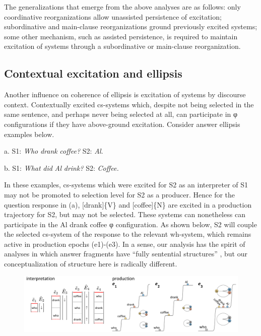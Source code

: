   The generalizations that emerge from the above analyses are as follows: only coordinative reorganizations allow unassisted persistence of excitation; subordinative and main-clause reorganizations ground previously excited systems; some other mechanism, such as assisted persistence, is required to maintain excitation of systems through a subordinative or main-clause reorganization. 

\subsection{Contextual excitation and ellipsis}

Another influence on coherence of ellipsis is excitation of systems by discourse context. Contextually excited cs-systems which, despite not being selected in the same sentence, and perhaps never being selected at all, can participate in φ configurations if they have above-ground excitation. Consider answer ellipsis examples below.

    a.    S1: \textit{Who} \textit{drank} \textit{coffee?}  S2: \textit{Al}.

     b.    S1: \textit{What} \textit{did} \textit{Al} \textit{drink?}   S2: \textit{Coffee.}

  In these examples, cs-systems which were excited for S2 as an interpreter of S1 may not be promoted to selection level for S2 as a producer. Hence for the question response in (a), [drank]\{V\} and [coffee]\{N\} are excited in a production trajectory for S2, but may not be selected. These systems can nonetheless can participate in the {\textbar}Al drank coffee{\textbar} φ configuration. As shown below, S2 will couple the selected cs-system of the response to the relevant wh-system, which remains active in production epochs (e1)-(e3). In a sense, our analysis has the spirit of analyses in which answer fragments have “fully sentential structures”  \citep{Merchant2005}, but our conceptualization of structure here is radically different.

  
\begin{figure}
\includegraphics[width=\textwidth]{figures/Tilsen-img151.png}
\caption{\missingcaption}
\label{fig:}
\end{figure}
 

